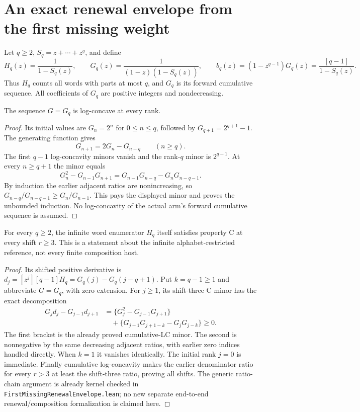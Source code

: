 \section{An exact renewal envelope from the first missing weight}
Let $q\ge2$, $S_q=z+\cdots+z^q$, and define
\[
 H_q(z)=\frac1{1-S_q(z)},\qquad
 G_q(z)=\frac1{(1-z)(1-S_q(z))},\qquad
 b_q(z)=(1-z^{q-1})G_q(z)=\frac{[q-1]}{1-S_q(z)}.
\]
Thus $H_q$ counts all words with parts at most $q$, and $G_q$
is its forward cumulative sequence. All coefficients of $G_q$ are
positive integers and nondecreasing.

\begin{lemma}
The sequence $G=G_q$ is log-concave at every rank.
\end{lemma}
\begin{proof}
Its initial values are $G_n=2^n$ for $0\le n\le q$, followed by
$G_{q+1}=2^{q+1}-1$. The generating function gives
\[
                 G_{n+1}=2G_n-G_{n-q}\qquad(n\ge q).
\]
The first $q-1$ log-concavity minors vanish and the rank-$q$ minor
is $2^{q-1}$. At every $n\ge q+1$ the minor equals
\[
 G_n^2-G_{n-1}G_{n+1}
       =G_{n-1}G_{n-q}-G_nG_{n-q-1}.
\]
By induction the earlier adjacent ratios are nonincreasing, so
$G_{n-q}/G_{n-q-1}\ge G_n/G_{n-1}$. This pays the displayed
minor and proves the unbounded induction. No log-concavity of
the actual arm's forward cumulative sequence is assumed.
\end{proof}

\begin{corollary}
For every $q\ge2$, the infinite word enumerator $H_q$ itself
satisfies property C at every shift $r\ge3$.
This is a statement about the infinite alphabet-restricted
reference, not every finite composition host.
\end{corollary}
\begin{proof}
Its shifted positive derivative is
$d_j=[z^j][q-1]H_q=G_q(j)-G_q(j-q+1)$.
Put $k=q-1\ge1$ and abbreviate $G=G_q$, with zero extension.
For $j\ge1$, its shift-three C minor has the exact decomposition
\[
\begin{split}
 G_jd_j-G_{j-1}d_{j+1}
 &=\{G_j^2-G_{j-1}G_{j+1}\}\\
 &\quad+\{G_{j-1}G_{j+1-k}-G_jG_{j-k}\}\ge0.
\end{split}
\]
The first bracket is the already proved cumulative-LC minor.
The second is nonnegative by the same decreasing adjacent
ratios, with earlier zero indices handled directly.
When $k=1$ it vanishes identically.
The initial rank $j=0$ is immediate. Finally cumulative
log-concavity makes the earlier denominator ratio for every
$r>3$ at least the shift-three ratio, proving all shifts.
The generic ratio-chain argument is already kernel checked
in \texttt{FirstMissingRenewalEnvelope.lean}; no new separate
end-to-end renewal/composition formalization is claimed here.
\end{proof}

